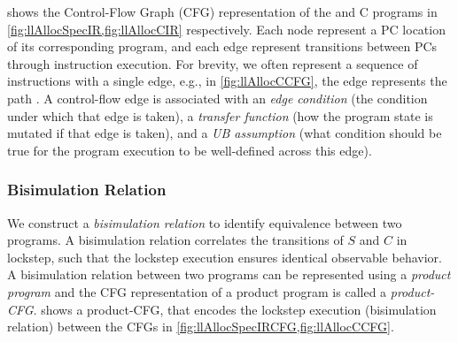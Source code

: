 

\vspace{-5px}
 shows the Control-Flow Graph (CFG) representation
of the \SpecL{} and C programs in \cref{fig:llAllocSpecIR,fig:llAllocCIR} respectively.
Each node represent a PC location of its corresponding program, and each edge represent
transitions between PCs through instruction execution. For brevity, we often represent
a sequence of instructions with a single edge, e.g., in \cref{fig:llAllocCCFG}, the edge
 represents the path .
A control-flow edge is associated with an {\em edge condition} (the condition under which that edge is taken),
a {\em transfer function} (how the program state is mutated if that edge is taken),
and a {\em UB assumption} (what condition should be true for the program
execution to be well-defined across this edge).

\subsubsection{Bisimulation Relation}
\label{sec:syn-bisim}
We construct a {\em bisimulation relation} to identify equivalence between two programs.
A bisimulation relation correlates the transitions of $S$ and $C$ in lockstep, such that the
lockstep execution ensures identical observable behavior.
A bisimulation relation between two programs can be represented using a {\em product program}
\cite{covac} and the CFG representation of a product program is called a {\em product-CFG}.
 shows a product-CFG, that encodes the lockstep execution
(bisimulation relation) between the CFGs in \cref{fig:llAllocSpecIRCFG,fig:llAllocCCFG}.


